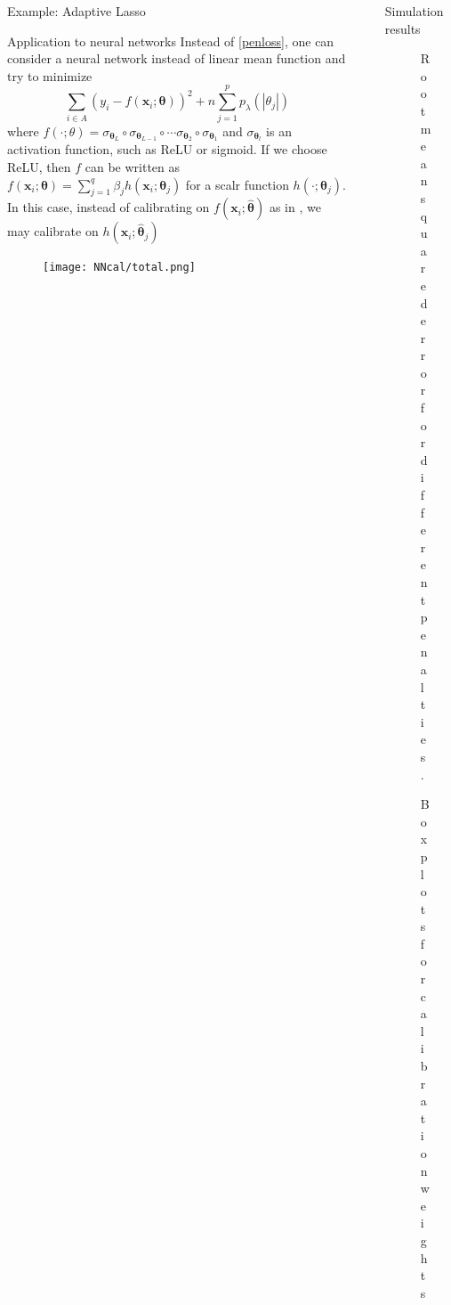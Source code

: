 \documentclass[final]{beamer}
\newlength{\sepwidth}
\newlength{\colwidth}
\newcommand{\separatorcolumn}{\begin{column}{\sepwidth}\end{column}}
\renewcommand{\bf}[1]{\boldsymbol{\mathbf{#1}}}
\newcommand{\abs}[1]{\left|#1\right|} %
\begin{document}
\begin{frame}[t]
\begin{columns}[t]
\begin{column}{\colwidth}
\begin{block}{Example: Adaptive Lasso}
  \end{block}

  \begin{block}{Application to neural networks}
    Instead of \eqref{penloss}, one can consider a neural network instead of linear mean function and try to minimize
        \begin{equation}
            \sum_{i \in A} (y_i - f(\bf x_i; \bf \theta))^2 + n \sum_{j = 1}^p p_\lambda(\abs{\theta_j})
        \end{equation}
    where $f(\cdot; \theta) = \sigma_{\bf \theta_L} \circ \sigma_{\bf \theta_{L-1}} \circ \cdots \sigma_{\bf \theta_{2}} \circ \sigma_{\bf \theta_1}$ and $\sigma_{\bf \theta_l}$ is an activation function, such as ReLU or sigmoid. If we choose ReLU, then $f$ can be written as $f(\bf x_i; \bf \theta) = \sum_{j = 1}^q \beta_j h(\bf x_i; \bf \theta_j)$ for a scalr function $h(\cdot; \bf \theta_j)$. In this case, instead of calibrating on $ f(\bf x_i; \hat {\bf \theta})$ as in \cite{montanari2005nonparametric}, we may calibrate on $h(\bf x_i; \hat {\bf \theta}_j)$
  \end{block}
  
   \begin{figure}%
    \centering
    \texttt{[image: NNcal/total.png]}
\end{figure}
  

\end{column}

\separatorcolumn

\begin{column}{\colwidth}

  \begin{block}{Simulation results}
\begin{figure}%
    \centering
    \caption{Root mean squared error for different penalties.}%
    \label{fig:example}%
    \centering
    \caption{Boxplots for calibration weights}%
    \label{fig:example}%
\end{figure}


\end{block}
\end{column}
\end{columns}
\end{frame}
\end{document}
